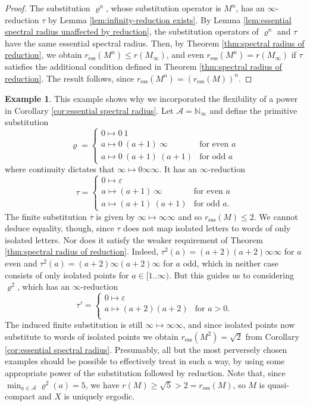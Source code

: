 \documentclass[11pt]{amsart}
\numberwithin{equation}{section}
\theoremstyle{plain}
\theoremstyle{definition}
\newtheorem{example}[theorem]{Example}
\newcommand{\N}{{\mathbb N}}
\newcommand{\mc}{\mathcal}
\newcommand{\A}{\mc A}
\newcommand{\sub}{\varrho}
\begin{document}
\begin{proof}
The substitution \(\sub^n\), whose substitution operator is \(M^n\), has an \(\infty\)-reduction \(\tau\) by Lemma \ref{lem:infinity-reduction exists}. By Lemma \ref{lem:essential spectral radius unaffected by reduction}, the substitution operators of \(\sub^n\) and \(\tau\) have the same essential spectral radius. Then, by Theorem \ref{thm:spectral radius of reduction}, we obtain \(r_\mathrm{ess}(M^n) \leq r(M_\infty)\), and even \(r_\mathrm{ess}(M^n) = r(M_\infty)\) if \(\tau\) satisfies the additional condition defined in Theorem \ref{thm:spectral radius of reduction}. The result follows, since \(r_\mathrm{ess}(M^n) = (r_\mathrm{ess}(M))^n\).
\end{proof}

\begin{example}
This example shows why we incorporated the flexibility of a power in Corollary \ref{cor:essential spectral radius}. Let \(\A = \N_\infty\) and define the primitive substitution
\[
\sub =
\begin{cases}
0 \mapsto 0 \ 1             & \\
a \mapsto 0 \ (a+1) \ \infty & \text{for even } a \\
a \mapsto 0 \ (a+1) \ (a+1)  & \text{for odd }  a
\end{cases}
\]
where continuity dictates that \(\infty \mapsto 0 \infty \infty\). It has an \(\infty\)-reduction
\[
\tau =
\begin{cases}
0 \mapsto \varepsilon  & \\
a \mapsto (a+1) \ \infty & \text{for even } a \\
a \mapsto (a+1) \ (a+1)  & \text{for odd }  a .
\end{cases}
\]
The finite substitution \(\overline{\tau}\) is given by \(\infty \mapsto \infty \infty\) and so \(r_\mathrm{ess}(M) \leq 2\). We cannot deduce equality, though, since \(\tau\) does not map isolated letters to words of only isolated letters. Nor does it satisfy the weaker requirement of Theorem \ref{thm:spectral radius of reduction}. Indeed, \(\tau^2(a) = (a+2) (a+2) \infty \infty\) for \(a\) even and \(\tau^2(a) = (a+2) \infty (a+2) \infty\) for \(a\) odd, which in neither case consists of only isolated points for \(a \in [1..\infty)\). But this guides us to considering \(\sub^2\), which has an \(\infty\)-reduction
\[
\tau' =
\begin{cases}
0 \mapsto \varepsilon & \\
a \mapsto (a+2) (a+2) & \text{for } a > 0 . \\
\end{cases}
\]
The induced finite substitution is still \(\infty \mapsto \infty \infty\), and since isolated points now substitute to words of isolated points we obtain \(r_\mathrm{ess}(M^2) = \sqrt{2}\) from Corollary \ref{cor:essential spectral radius}. Presumably, all but the most perversely chosen examples should be possible to effectively treat in such a way, by using some appropriate power of the substitution followed by reduction. Note that, since \(\min_{a \in \A} \sub^2(a) = 5\), we have \(r(M) \geq \sqrt{5} > 2 = r_\mathrm{ess}(M)\), so \(M\) is quasi-compact and \(X\) is uniquely ergodic. 
\end{example}
\end{document}
